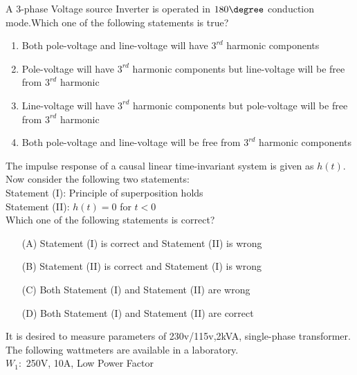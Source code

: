  \iffalse
\chapter{2008}
\author{AI24BTECH11011}
\section{ee}
\fi                                 


    \item A 3-phase Voltage source Inverter is operated in $180{\degree}$  conduction mode.Which one of the following statements is true?
    \begin{enumerate}
        \item Both pole-voltage and line-voltage will have $3^{rd}$ harmonic components
        \item Pole-voltage will have $3^{rd}$ harmonic components but line-voltage will be free from $3^{rd}$ harmonic
         \item Line-voltage will have $3^{rd}$ harmonic components but pole-voltage will be free from $3^{rd}$ harmonic
         \item  Both pole-voltage and line-voltage will be free from $3^{rd}$ harmonic components
    \end{enumerate}
    \item The impulse response of a causal linear time-invariant system is given as $h(t)$. Now consider the following two statements:\\
     Statement (I): Principle of superposition holds\\
     Statement (II): $h(t) = 0$ for $t < 0$\\
     Which one of the following statements is correct?
     \begin{enumerate}
    \item[(A)] Statement (I) is correct and Statement (II) is wrong
    \item[(B)] Statement (II) is correct and Statement (I) is wrong
    \item[(C)] Both Statement (I) and Statement (II) are wrong
    \item[(D)] Both Statement (I) and Statement (II) are correct
    \end{enumerate}
    \item It is desired to measure parameters of 230v/115v,2kVA, single-phase transformer. The following wattmeters are available in a laboratory.\\
    $W_1:$ 250V, 10A, Low Power Factor\\
